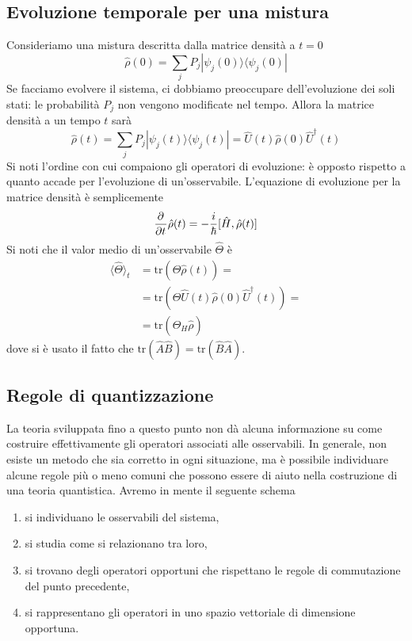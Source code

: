 \documentclass[a4paper, 11pt]{article}
\newcommand{\tr}{\mathrm{tr}}
\newcommand{\ham}{\hat{H}}
\renewcommand{\U}{\hat{U}}
\renewcommand{\ket}[1]{| #1\rangle}
\renewcommand{\bra}[1]{\langle #1|}
\begin{document}
\subsection{Evoluzione temporale per una mistura}
Consideriamo una mistura descritta dalla matrice densità a $t=0$
\[\hat{\rho}(0)=\sum_{j}P_j\ket{\psi_j(0)}\bra{\psi_j(0)}\]
Se facciamo evolvere il sistema, ci dobbiamo preoccupare dell'evoluzione dei soli stati: le probabilità $P_j$ non vengono modificate nel tempo. Allora la matrice densità a un tempo $t$ sarà
\[\hat{\rho}(t)=\sum_{j}P_j\ket{\psi_j(t)}\bra{\psi_j(t)}=\U(t)\hat{\rho}(0)\U^\dagger(t)\]
Si noti l'ordine con cui compaiono gli operatori di evoluzione: è opposto rispetto a quanto accade per l'evoluzione di un'osservabile. L'equazione di evoluzione per la matrice densità è semplicemente
\[\pder{}{t}\hat{\rho}(t)=-\frac{i}{\hbar}[\ham,\hat{\rho}(t)]\]
Si noti che il valor medio di un'osservabile $\hat{\Theta}$ è
\begin{align*}
	\langle\hat{\Theta}\rangle_t&=\tr(\hat{\Theta}\hat{\rho}(t))=\\&=\tr(\hat{\Theta}\U(t)\hat{\rho}(0)\U^\dagger(t))=\\&=\tr(\hat{\Theta}_H\hat{\rho})
\end{align*}
dove si è usato il fatto che $\tr(\hat{A}\hat{B})=\tr(\hat{B}\hat{A})$.
\newpage
\subsection{Regole di quantizzazione}
La teoria sviluppata fino a questo punto non dà alcuna informazione su come costruire effettivamente gli operatori associati alle osservabili. In generale, non esiste un metodo che sia corretto in ogni situazione, ma è possibile individuare alcune regole più o meno comuni che possono essere di aiuto nella costruzione di una teoria quantistica. Avremo in mente il seguente schema
\begin{enumerate}
	\item si individuano le osservabili del sistema,
	\item si studia come si relazionano tra loro,
	\item si trovano degli operatori opportuni che rispettano le regole di commutazione del punto precedente,
	\item si rappresentano gli operatori in uno spazio vettoriale di dimensione opportuna.
\end{enumerate}
\end{document}
